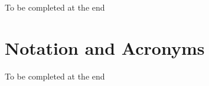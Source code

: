 \documentclass[ %
                    author={James Stephenson},
                supervisor={Dr. Edwin Simpson},
                    degree={MSc},
                     title={Bayesian Deep Learning For Extractive Test Summarisation},
                  subtitle={},
                      type={},
                      year={2023}]{dissertation}
\begin{document}
		To be completed at the end
		
		
	
	\chapter*{Notation and Acronyms}
	
		To be completed at the end
		
\end{document}
